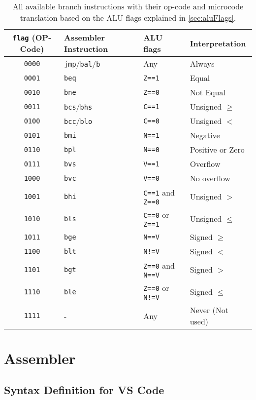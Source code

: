 \begin{table}
  \centering
  \renewcommand{\arraystretch}{1.25}
  \caption{All available branch instructions with their op-code and microcode translation based on the \gls{ALU} flags explained in \cref{sec:aluFlags}.}
  \label{tab:mc_flagMeanings}
  \begin{tabularx}{\textwidth}{ |c|l|l|X| }
    \hline
    \texttt{flag} (OP-Code) & Assembler Instruction                & \gls{ALU} flags                 & Interpretation   \\\hline\hline
    \texttt{0000} & \texttt{jmp}/\texttt{bal}/\texttt{b} & Any                             & Always           \\\hline
    \texttt{0001} & \texttt{beq}                         & \texttt{Z==1}                   & Equal            \\\hline
    \texttt{0010} & \texttt{bne}                         & \texttt{Z==0}                   & Not Equal        \\\hline
    \texttt{0011} & \texttt{bcs}/\texttt{bhs}            & \texttt{C==1}                   & Unsigned $\geq$  \\\hline
    \texttt{0100} & \texttt{bcc}/\texttt{blo}            & \texttt{C==0}                   & Unsigned $<$     \\\hline
    \texttt{0101} & \texttt{bmi}                         & \texttt{N==1}                   & Negative         \\\hline
    \texttt{0110} & \texttt{bpl}                         & \texttt{N==0}                   & Positive or Zero \\\hline
    \texttt{0111} & \texttt{bvs}                         & \texttt{V==1}                   & Overflow         \\\hline
    \texttt{1000} & \texttt{bvc}                         & \texttt{V==0}                   & No overflow      \\\hline
    \texttt{1001} & \texttt{bhi}                         & \texttt{C==1} and \texttt{Z==0} & Unsigned $>$     \\\hline
    \texttt{1010} & \texttt{bls}                         & \texttt{C==0} or \texttt{Z==1}  & Unsigned $\leq$  \\\hline
    \texttt{1011} & \texttt{bge}                         & \texttt{N==V}                   & Signed $\geq$    \\\hline
    \texttt{1100} & \texttt{blt}                         & \texttt{N!=V}                   & Signed $<$       \\\hline
    \texttt{1101} & \texttt{bgt}                         & \texttt{Z==0} and \texttt{N==V} & Signed $>$       \\\hline
    \texttt{1110} & \texttt{ble}                         & \texttt{Z==0} or \texttt{N!=V}  & Signed $\leq$    \\\hline
    \texttt{1111} & -                                    & Any                             & Never (Not used) \\\hline
  \end{tabularx}
\end{table}

\section{Assembler}
\subsection{Syntax Definition for VS Code}